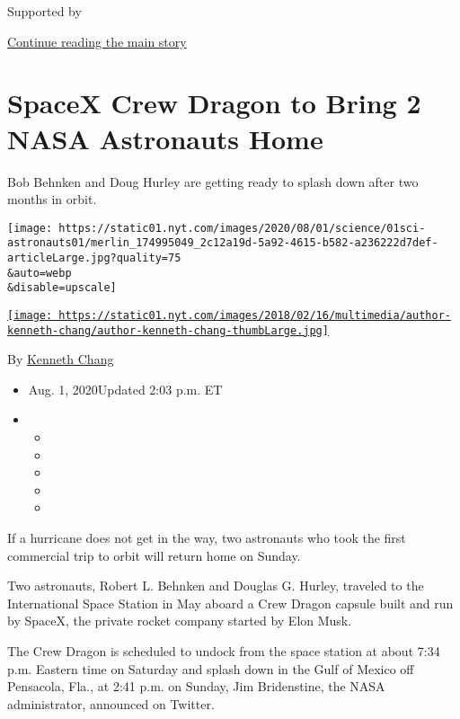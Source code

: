 Supported by

\protect\hyperlink{after-sponsor}{Continue reading the main story}

\hypertarget{spacex-crew-dragon-to-bring-2-nasa-astronauts-home}{%
\section{SpaceX Crew Dragon to Bring 2 NASA Astronauts
Home}\label{spacex-crew-dragon-to-bring-2-nasa-astronauts-home}}

Bob Behnken and Doug Hurley are getting ready to splash down after two
months in orbit.

\texttt{[image: https://static01.nyt.com/images/2020/08/01/science/01sci-astronauts01/merlin\_174995049\_2c12a19d-5a92-4615-b582-a236222d7def-articleLarge.jpg?quality=75\\\&auto=webp\\\&disable=upscale]}

\href{https://www.nytimes.com/by/kenneth-chang}{\texttt{[image: https://static01.nyt.com/images/2018/02/16/multimedia/author-kenneth-chang/author-kenneth-chang-thumbLarge.jpg]}}

By \href{https://www.nytimes.com/by/kenneth-chang}{Kenneth Chang}

\begin{itemize}
\item
  Aug. 1, 2020Updated 2:03 p.m. ET
\item
  \begin{itemize}
  \item
  \item
  \item
  \item
  \item
  \end{itemize}
\end{itemize}

If a hurricane does not get in the way, two astronauts who took the
first commercial trip to orbit will return home on Sunday.

Two astronauts, Robert L. Behnken and Douglas G. Hurley, traveled to the
International Space Station in May aboard a Crew Dragon capsule built
and run by SpaceX, the private rocket company started by Elon Musk.

The Crew Dragon is scheduled to undock from the space station at about
7:34 p.m. Eastern time on Saturday and splash down in the Gulf of Mexico
off Pensacola, Fla., at 2:41 p.m. on Sunday, Jim Bridenstine, the NASA
administrator, announced on Twitter.

